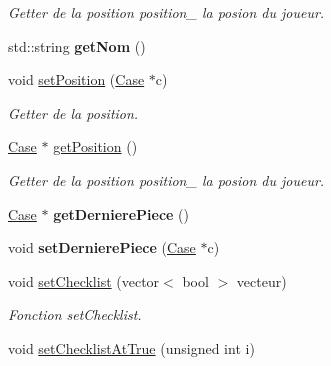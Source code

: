 \begin{DoxyCompactItemize}
\begin{DoxyCompactList}\small\item\em \-Getter de la position  position\-\_\- la posion du joueur. \end{DoxyCompactList}\item 
\hypertarget{classJoueur_a5ba8036208a35efd6bf37a86b36063b0}{std\-::string {\bfseries get\-Nom} ()}\label{classJoueur_a5ba8036208a35efd6bf37a86b36063b0}

\item 
void \hyperlink{classJoueur_aff78215b191d488c6555d100060fc2d6}{set\-Position} (\hyperlink{classCase}{\-Case} $\ast$c)
\begin{DoxyCompactList}\small\item\em \-Getter de la position. \end{DoxyCompactList}\item 
\hypertarget{classJoueur_a528cac966c6cfeab47e666ce3b2735c2}{\hyperlink{classCase}{\-Case} $\ast$ \hyperlink{classJoueur_a528cac966c6cfeab47e666ce3b2735c2}{get\-Position} ()}\label{classJoueur_a528cac966c6cfeab47e666ce3b2735c2}

\begin{DoxyCompactList}\small\item\em \-Getter de la position  position\-\_\- la posion du joueur. \end{DoxyCompactList}\item 
\hypertarget{classJoueur_a32909e93ab648b236fd670b8a24c5fb6}{\hyperlink{classCase}{\-Case} $\ast$ {\bfseries get\-Derniere\-Piece} ()}\label{classJoueur_a32909e93ab648b236fd670b8a24c5fb6}

\item 
\hypertarget{classJoueur_ace4248a785b7be8e12bcaaf84e3a41b5}{void {\bfseries set\-Derniere\-Piece} (\hyperlink{classCase}{\-Case} $\ast$c)}\label{classJoueur_ace4248a785b7be8e12bcaaf84e3a41b5}

\item 
\hypertarget{classJoueur_a5d32e5ba9665404f3b30fa5f548aaf43}{void \hyperlink{classJoueur_a5d32e5ba9665404f3b30fa5f548aaf43}{set\-Checklist} (vector$<$ bool $>$ vecteur)}\label{classJoueur_a5d32e5ba9665404f3b30fa5f548aaf43}

\begin{DoxyCompactList}\small\item\em \-Fonction set\-Checklist. \end{DoxyCompactList}\item 
\hypertarget{classJoueur_a8a94eef8959d5d7f7495429ceaf68124}{void \hyperlink{classJoueur_a8a94eef8959d5d7f7495429ceaf68124}{set\-Checklist\-At\-True} (unsigned int i)}\label{classJoueur_a8a94eef8959d5d7f7495429ceaf68124}


\end{DoxyCompactItemize}
